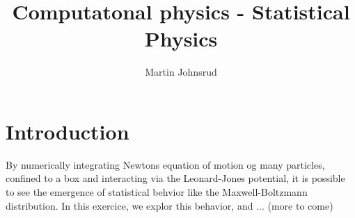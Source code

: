 \documentclass{article}
\title{Computatonal physics - Statistical Physics}
\author{Martin Johnsrud}
\begin{document}
    \maketitle
    
    \section*{Introduction}
    By numerically integrating Newtons equation of motion og many particles, confined to a box and interacting via the Leonard-Jones potential, it is possible to see the emergence of statistical behvior like the Maxwell-Boltzmann distribution. In this exercice, we explor this behavior, and ... (more to come)
\end{document}
